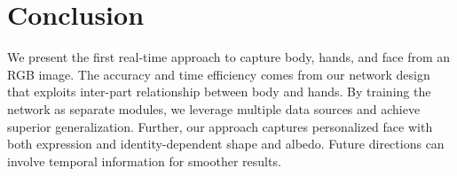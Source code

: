 \documentclass[final]{cvpr}
\begin{document}
  \section{Conclusion}
We present the first real-time approach to capture body, hands, and face from an RGB image.
The accuracy and time efficiency comes from our network design that exploits inter-part relationship between body and hands.
By training the network as separate modules, we leverage multiple data sources and achieve superior generalization.
Further, our approach captures personalized face with both expression and identity-dependent shape and albedo.
Future directions can involve temporal information for smoother results.
 
{
  \small
  
  
}
\end{document}
